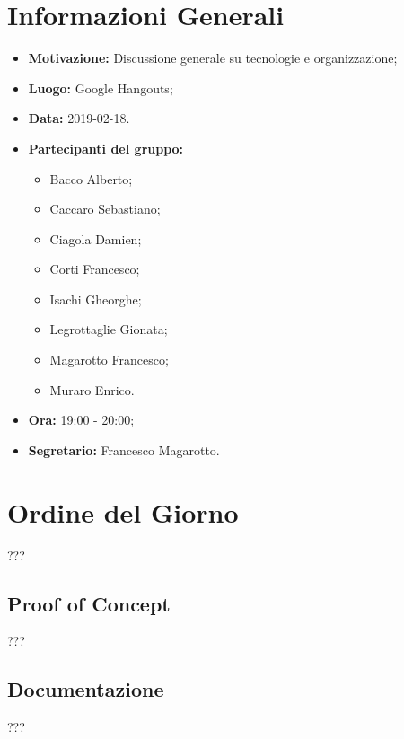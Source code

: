 \documentclass[a4paper, oneside, openany, dvipsnames, table]{article}
\begin{document}
\copertina{}


\newpage
\tableofcontents
\newpage
\section{Informazioni Generali}
\begin{itemize}
\item \textbf{Motivazione:} Discussione generale su tecnologie e organizzazione;
\item \textbf{Luogo:} Google Hangouts;
\item \textbf{Data:} 2019-02-18.
\item \textbf{Partecipanti del gruppo:} \hfill
	\begin{itemize}
	\item Bacco Alberto;
	\item Caccaro Sebastiano;
	\item Ciagola Damien;
	\item Corti Francesco;
	\item Isachi Gheorghe;
	\item Legrottaglie Gionata;
	\item Magarotto Francesco;
	\item Muraro Enrico.
	\end{itemize} 
\item \textbf{Ora:} 19:00 - 20:00;
\item \textbf{Segretario:} Francesco Magarotto.
\end{itemize}

\section{Ordine del Giorno}
???



\subsection{Proof of Concept}
???
	
\subsection{Documentazione}
???
\end{document}
